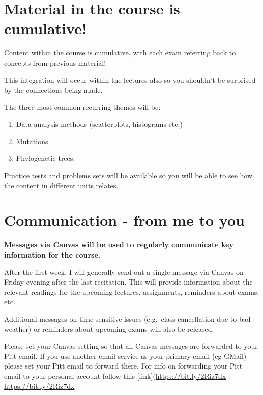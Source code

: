 \documentclass[
]{book}
\providecommand{\tightlist}{%
  \setlength{\itemsep}{0pt}\setlength{\parskip}{0pt}}
\begin{document}
\hypertarget{material-in-the-course-is-cumulative}{%
\chapter{Material in the course is cumulative!}\label{material-in-the-course-is-cumulative}}

Content within the course is cumulative, with each exam referring back to concepts from previous material!

This integration will occur within the lectures also so you shouldn't be surprised by the connections being made.

The three most common recurring themes will be:

\begin{enumerate}
\def\labelenumi{\arabic{enumi}.}
\tightlist
\item
  Data analysis methods (scatterplots, histograms etc.)
\item
  Mutations
\item
  Phylogenetic trees.
\end{enumerate}

Practice tests and problems sets will be available so you will be able to see how the content in different units relates.

\hypertarget{communication---from-me-to-you}{%
\chapter{Communication - from me to you}\label{communication---from-me-to-you}}

\textbf{Messages via Canvas will be used to regularly communicate key information for the course.}

After the first week, I will generally send out a single message via Canvas on Friday evening after the last recitation. This will provide information about the relevant readings for the upcoming lectures, assignments, reminders about exams, etc.

Additional messages on time-sensitive issues (e.g.~class cancellation due to bad weather) or reminders about upcoming exams will also be released.

Please set your Canvas setting so that all Canvas messages are forwarded to your Pitt email. If you use another email service as your primary email (eg GMail) please set your Pitt email to forward there.
For info on forwarding your Pitt email to your personal account follow this {[}link{]}(\url{https://bit.ly/2Riz7dx} : \url{https://bit.ly/2Riz7dx}
\end{document}
